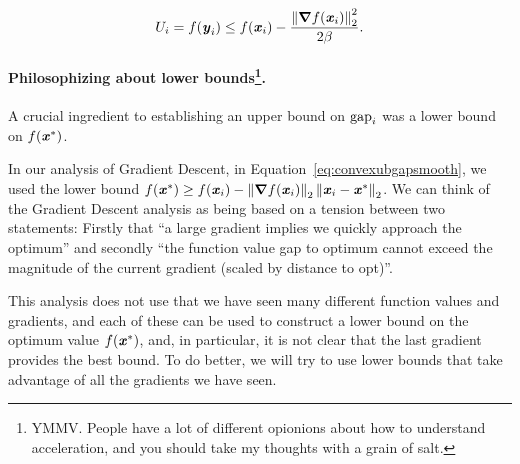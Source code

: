 \begin{equation}
 U_i = f(\boldsymbol{\mathit{y}}_i) \leq  f(\boldsymbol{\mathit{x}}_{i})
 - \frac{\left\| \boldsymbol{\nabla}  f(\boldsymbol{\mathit{x}}_{i}) \right\|_2^2}{2\beta}
 .\label{eq:agdub}
\end{equation}
\paragraph{Philosophizing about lower bounds\protect\footnote{YMMV. People
   have a lot of different opionions about how to understand acceleration, and you should take my thoughts with a grain of salt.}.}
A crucial ingredient to establishing an upper bound on $\text{gap}_i $ was a
lower bound on $f(\boldsymbol{\mathit{x}}^*)$.

In our analysis of Gradient Descent, in Equation~\eqref{eq:convexubgapsmooth}, we used the
lower bound ${f(\boldsymbol{\mathit{x}}^*) \geq f(\boldsymbol{\mathit{x}}_i) - \left\| \boldsymbol{\nabla} f(\boldsymbol{\mathit{x}}_{i}) \right\|_2 \left\| \boldsymbol{\mathit{x}}_i - \boldsymbol{\mathit{x}}^* \right\|_2 }$.
%
We can think of the Gradient Descent analysis as being based on a
tension between two statements: Firstly that ``a large gradient implies we quickly approach
the optimum'' and secondly ``the function value gap to optimum cannot exceed the magnitude of
the current gradient (scaled by distance to opt)''.

This analysis does not use that we have seen many different
function values and gradients, and each of these can be used to
construct a lower bound on the optimum value $f(\boldsymbol{\mathit{x}}^*)$, and, in
particular, it is not clear that the last gradient provides the best bound.
To do better, we will try to use lower bounds that take advantage of
all the gradients we have seen.

%
